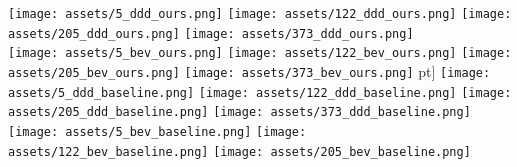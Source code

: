 \documentclass[10pt,twocolumn,letterpaper]{article}
\begin{document}
   
   \begin{figure*}[ht!]
           \texttt{[image: assets/5\_ddd\_ours.png]}
       \endminipage \hspace{1pt}
           \texttt{[image: assets/122\_ddd\_ours.png]}
       \endminipage \hspace{1pt}
           \texttt{[image: assets/205\_ddd\_ours.png]}
       \endminipage \hspace{1pt}
           \texttt{[image: assets/373\_ddd\_ours.png]}
       \endminipage\\
           \texttt{[image: assets/5\_bev\_ours.png]}
       \endminipage \hspace{1pt}
           \texttt{[image: assets/122\_bev\_ours.png]}
       \endminipage \hspace{1pt}
           \texttt{[image: assets/205\_bev\_ours.png]}
       \endminipage \hspace{1pt}
           \texttt{[image: assets/373\_bev\_ours.png]}
       \endminipage\3pt]
           \texttt{[image: assets/5\_ddd\_baseline.png]}
       \endminipage \hspace{1pt}
           \texttt{[image: assets/122\_ddd\_baseline.png]}
       \endminipage \hspace{1pt}
           \texttt{[image: assets/205\_ddd\_baseline.png]}
       \endminipage \hspace{1pt}
           \texttt{[image: assets/373\_ddd\_baseline.png]}
       \endminipage\\
           \texttt{[image: assets/5\_bev\_baseline.png]}
       \endminipage \hspace{1pt}
           \texttt{[image: assets/122\_bev\_baseline.png]}
       \endminipage \hspace{1pt}
           \texttt{[image: assets/205\_bev\_baseline.png]}

\end{figure*}
\end{document}

